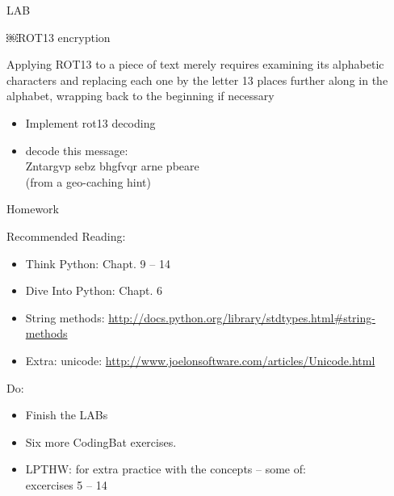 \documentclass{beamer}
\begin{document}
\begin{frame}[fragile]{LAB}

\vfill
\Large￼ROT13 encryption

\vfill
Applying ROT13 to a piece of text merely requires examining its alphabetic
characters and replacing each one by the letter 13 places further along in
the alphabet, wrapping back to the beginning if necessary

\begin{itemize}
  \item Implement rot13 decoding 
  \item  decode this message: \\
     \hspace{0.5in} Zntargvp sebz bhgfvqr arne pbeare \\
     \hspace{0.5in} (from a geo-caching hint)
\end{itemize}

\end{frame}



\begin{frame}[fragile]{Homework}

{\Large Recommended Reading:}
\begin{itemize}
  \item Think Python: Chapt. 9 -- 14
  \item Dive Into Python: Chapt. 6
  \item String methods: \url{http://docs.python.org/library/stdtypes.html#string-methods}
  \item Extra: unicode: \url{http://www.joelonsoftware.com/articles/Unicode.html}
\end{itemize}

\vfill
{\Large Do:}
\begin{itemize}
    \item Finish the LABs
    \item Six more CodingBat exercises. 
    \item LPTHW: for extra practice with the concepts -- some of:\\
          excercises 5 -- 14
\end{itemize}

\end{frame}
\end{document}
